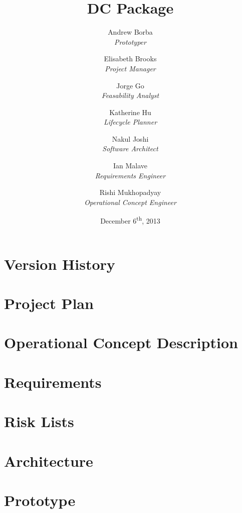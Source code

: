 \documentclass[titlepage]{article}
\title{DC Package}
\author{
	Andrew Borba\\ \emph{Prototyper}	\and
	 Elisabeth Brooks\\ \emph{Project Manager}	\and
	 Jorge Go\\ \emph{Feasability Analyst}	\and
	 Katherine Hu\\ \emph{Lifecycle Planner}	\and
	 Nakul Joshi\\ \emph{Software Architect}	\and
	 Ian Malave\\ \emph{Requirements Engineer}	\and
	 Rishi Mukhopadyay\\ \emph{Operational Concept Engineer}
}
\date{December 6\textsuperscript{th}, 2013}
\begin{document}
\pagestyle{fancy}
\chead{}
\lfoot{}
\cfoot{\thepage}
\rfoot{}

\maketitle
\tableofcontents


\clearpage

\section{Version History}


\clearpage

\section{Project Plan}

\clearpage

%

\section{Operational Concept Description}


\clearpage

\section{Requirements}

\clearpage

\section{Risk Lists}


\clearpage

\section{Architecture}


\clearpage

\section{Prototype}

		
\end{document}
